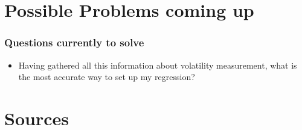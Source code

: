 \documentclass[aspectratio=169]{beamer}
\begin{document}
\section{Possible Problems coming up}

\begin{frame}
\frametitle{Questions currently to solve}
	\begin{itemize}
	\item Having gathered all this information about volatility measurement, what is the most accurate way to set up my regression?
	
	\end{itemize}
\end{frame}

\section*{Sources}
\begin{frame}
\printbibliography
\end{frame}
\end{document}
